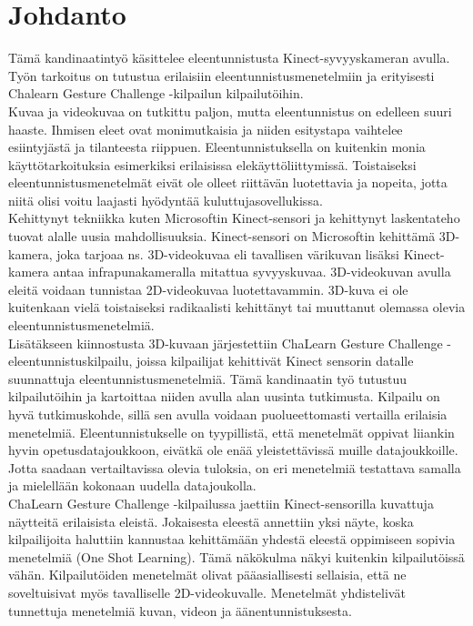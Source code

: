 
\section{Johdanto}

Tämä kandinaatintyö käsittelee eleentunnistusta Kinect-syvyyskameran avulla. 
Työn tarkoitus on tutustua erilaisiin eleentunnistusmenetelmiin ja erityisesti Chalearn Gesture Challenge -kilpailun kilpailutöihin. 
\\

Kuvaa ja videokuvaa on tutkittu paljon, mutta eleentunnistus on edelleen suuri haaste. Ihmisen eleet
ovat monimutkaisia ja niiden esitystapa vaihtelee esiintyjästä ja tilanteesta riippuen. Eleentunnistuksella
on kuitenkin monia käyttötarkoituksia esimerkiksi erilaisissa elekäyttöliittymissä. Toistaiseksi
eleentunnistusmenetelmät eivät ole olleet riittävän luotettavia ja nopeita, jotta niitä olisi voitu
laajasti hyödyntää kuluttujasovellukissa.\\

Kehittynyt tekniikka kuten Microsoftin Kinect-sensori ja kehittynyt laskentateho tuovat alalle uusia mahdollisuuksia. 
Kinect-sensori on Microsoftin kehittämä 3D-kamera, joka tarjoaa ns. 3D-videokuvaa eli tavallisen värikuvan lisäksi Kinect-kamera antaa infrapunakameralla mitattua syvyyskuvaa. 
3D-videokuvan avulla eleitä voidaan tunnistaa 2D-videokuvaa luotettavammin. 3D-kuva ei ole kuitenkaan 
vielä toistaiseksi radikaalisti kehittänyt tai muuttanut olemassa olevia eleentunnistusmenetelmiä.\\

Lisätäkseen kiinnostusta 3D-kuvaan järjestettiin ChaLearn Gesture Challenge -eleentunnistuskilpailu, joissa kilpailijat kehittivät Kinect sensorin datalle suunnattuja 
eleentunnistusmenetelmiä. Tämä kandinaatin työ tutustuu kilpailutöihin ja kartoittaa niiden avulla alan uusinta tutkimusta. Kilpailu on hyvä tutkimuskohde,
sillä sen avulla voidaan puolueettomasti vertailla erilaisia menetelmiä. Eleentunnistukselle on tyypillistä, 
että menetelmät oppivat liiankin hyvin opetusdatajoukkoon, eivätkä ole enää yleistettävissä muille datajoukkoille. Jotta saadaan vertailtavissa olevia tuloksia, on eri menetelmiä testattava samalla ja mielellään kokonaan uudella datajoukolla.\\

ChaLearn Gesture Challenge -kilpailussa jaettiin Kinect-sensorilla kuvattuja näytteitä erilaisista eleistä.
Jokaisesta eleestä annettiin yksi näyte, koska kilpailijoita haluttiin kannustaa kehittämään yhdestä 
eleestä oppimiseen sopivia menetelmiä (One Shot Learning). Tämä näkökulma näkyi kuitenkin kilpailutöissä
vähän. Kilpailutöiden menetelmät olivat pääasiallisesti sellaisia, että ne soveltuisivat myös tavalliselle
2D-videokuvalle. Menetelmät yhdistelivät tunnettuja menetelmiä kuvan, videon ja äänentunnistuksesta.\\

